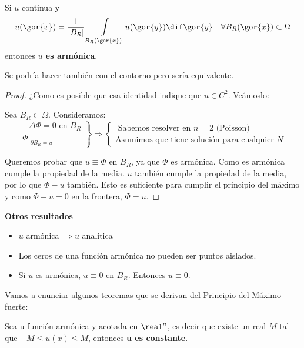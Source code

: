 		\begin{theorem}
		Si $u$ continua y
		\[ u(\gor{x}) = \frac{1}{|B_R|} \int\limits_{B_R(\gor{x})} u(\gor{y})\dif\gor{y} \quad \forall B_R(\gor{x}) \subset \Omega \]
		entonces {\bf $u$ es armónica}.
		\end{theorem}
		\obs Se podría hacer también con el contorno pero sería equivalente.

		\begin{proof}

			¿Como es posible que esa identidad indique que $u \in C^2$. Veámoslo:

			Sea $B_R \subset \Omega$. Consideramos:
			\[ \left. \begin{array}{l}
				- \Delta \Phi = 0 \text{ en } B_R \\
				\Phi |_{\partial B_R = u}
			\end{array} \right\} \Rightarrow \begin{cases}
				\text{ Sabemos resolver en } n = 2 \text{ (Poisson)}\\
				\text{Asumimos que tiene solución para cualquier } N
			\end{cases}
			\]

			Queremos probar que $u \equiv \Phi$ en $B_R$, ya que $\Phi$ es armónica. Como es armónica cumple la propiedad de la media. $u$ también cumple la propiedad de la media, por lo que $\Phi - u$ también. Esto es suficiente para cumplir el principio del máximo y como $\Phi -u = 0$ en la frontera, $\Phi = u$.

		\end{proof}

		\textbf{Otros resultados}

		\begin{itemize}
			\item $u$ armónica $\Rightarrow u$ analítica
			\item Los ceros de una función armónica no pueden ser puntos aislados.
			\item Si $u$ es armónica, $u \equiv 0$ en $B_R$. Entonces $u \equiv 0$.
		\end{itemize}




		Vamos a enunciar algunos teoremas que se derivan del Principio del Máximo fuerte:

		\begin{theorem} $ $\\ %
		Sea u función armónica y acotada en $\real^n$, es decir que existe un real $M$ tal que ${-M \leq u(x) \leq M}$, entonces {\bf u es constante}.
		\end{theorem}

